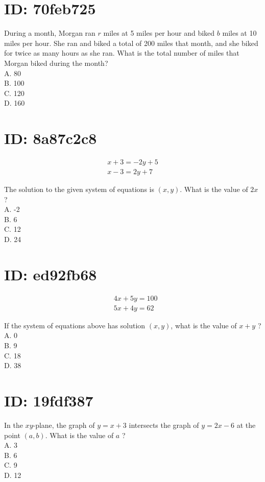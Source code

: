 

\section*{ID: 70feb725}
During a month, Morgan ran $r$ miles at 5 miles per hour and biked $b$ miles at 10 miles per hour. She ran and biked a total of 200 miles that month, and she biked for twice as many hours as she ran. What is the total number of miles that Morgan biked during the month?\\
A. 80\\
B. 100\\
C. 120\\
D. 160

\section*{ID: 8a87c2c8}
$$
\begin{gathered}
x+3=-2 y+5 \\
x-3=2 y+7
\end{gathered}
$$

The solution to the given system of equations is $(x, y)$. What is the value of $2 x$ ?\\
A. -2\\
B. 6\\
C. 12\\
D. 24

\section*{ID: ed92fb68}
$$
\begin{aligned}
& 4 x+5 y=100 \\
& 5 x+4 y=62
\end{aligned}
$$

If the system of equations above has solution $(x, y)$, what is the value of $x+y$ ?\\
A. 0\\
B. 9\\
C. 18\\
D. 38

\section*{ID: 19fdf387}
In the $x y$-plane, the graph of $y=x+3$ intersects the graph of $y=2 x-6$ at the point $(a, b)$. What is the value of $a$ ?\\
A. 3\\
B. 6\\
C. 9\\
D. 12


